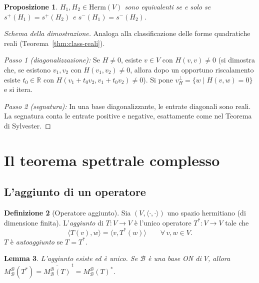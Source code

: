 \documentclass[11pt, a4paper]{book}
\theoremstyle{definition}
\newtheorem{definizione}{Definizione}[section]
\theoremstyle{plain}
\newtheorem{proposizione}[definizione]{Proposizione}
\newtheorem{lemma}[definizione]{Lemma}
\theoremstyle{remark}
\newcommand{\R}{\mathbb{R}}
\begin{document}
\begin{proposizione}
\label{prop:class-hermitiane}
$H_1, H_2 \in \mathrm{Herm}(V)$ sono equivalenti se e solo se $s^+(H_1) = s^+(H_2)$ e $s^-(H_1) = s^-(H_2)$.
\end{proposizione}

\begin{proof}[Schema della dimostrazione]
Analoga alla classificazione delle forme quadratiche reali (Teorema~\ref{thm:class-reali}).

\textit{Passo 1 (diagonalizzazione):} Se $H \neq 0$, esiste $v \in V$ con $H(v,v) \neq 0$ (si dimostra che, se esistono $v_1,v_2$ con $H(v_1,v_2) \neq 0$, allora dopo un opportuno riscalamento esiste $t_0 \in \R$ con $H(v_1+t_0v_2,v_1+t_0v_2) \neq 0$). Si pone $v^\perp_H = \{w \mid H(v,w)=0\}$ e si itera.

\textit{Passo 2 (segnatura):} In una base diagonalizzante, le entrate diagonali sono reali. La segnatura conta le entrate positive e negative, esattamente come nel Teorema di Sylvester.
\end{proof}

\section{Il teorema spettrale complesso}
\label{sec:spettrale-complesso}

\subsection{L'aggiunto di un operatore}

\begin{defbox}
\begin{definizione}[Operatore aggiunto]
\label{def:aggiunto}
Sia $(V,\langle\cdot,\cdot\rangle)$ uno spazio hermitiano (di dimensione finita). L'\emph{aggiunto} di $T \colon V \to V$ è l'unico operatore $T^* \colon V \to V$ tale che
\[
  \langle T(v),w\rangle = \langle v,T^*(w)\rangle \qquad \forall\, v,w \in V.
\]
$T$ è \emph{autoaggiunto} se $T = T^*$.
\end{definizione}
\end{defbox}

\begin{lemma}
L'aggiunto esiste ed è unico. Se $\mathcal{B}$ è una base ON di $V$, allora $M^\mathcal{B}_\mathcal{B}(T^*) = \overline{M^\mathcal{B}_\mathcal{B}(T)}^{\,t} = M^\mathcal{B}_\mathcal{B}(T)^*$.
\end{lemma}
\end{document}

